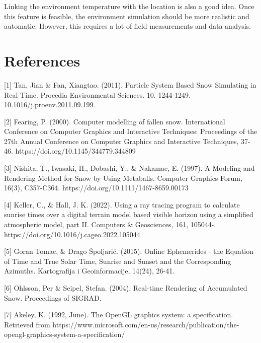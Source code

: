 \documentclass{article}
\begin{document}
Linking the environment temperature with the location is also a good idea. Once this feature is feasible, the environment simulation 
should be more realistic and automatic. However, this requires a lot of field measurements and data analysis.

\section*{References}

{
\small

[1] Tan, Jian \& Fan, Xiangtao. (2011). Particle System Based Snow Simulating in Real Time. Procedia Environmental Sciences. 
10. 1244-1249. 10.1016/j.proenv.2011.09.199. 

[2] Fearing, P. (2000). Computer modelling of fallen snow. International Conference on Computer Graphics and Interactive 
Techniques: Proceedings of the 27th Annual Conference on Computer Graphics and Interactive Techniques, 37-46. 
https://doi.org/10.1145/344779.344809

[3] Nishita, T., Iwasaki, H., Dobashi, Y., \& Nakamae, E. (1997). A Modeling and Rendering Method for Snow by Using Metaballs. 
Computer Graphics Forum, 16(3), C357-C364. https://doi.org/10.1111/1467-8659.00173

[4] Keller, C., \& Hall, J. K. (2022). Using a ray tracing program to calculate sunrise times over a digital terrain model based 
visible horizon using a simplified atmospheric model, part II. Computers \& Geosciences, 161, 105044-. 
https://doi.org/10.1016/j.cageo.2022.105044

[5] Goran Tomac, \& Drago Špoljarić. (2015). Online Ephemerides - the Equation of Time and True Solar Time, Sunrise and Sunset and 
the Corresponding Azimuths. Kartografija i Geoinformacije, 14(24), 26-41.

[6] Ohlsson, Per \& Seipel, Stefan. (2004). Real-time Rendering of Accumulated Snow. Proceedings of SIGRAD. 

[7] Akeley, K. (1992, June). The OpenGL graphics system: a specification. 
Retrieved from https://www.microsoft.com/en-us/research/publication/the-opengl-graphics-system-a-specification/

}

\end{document}
